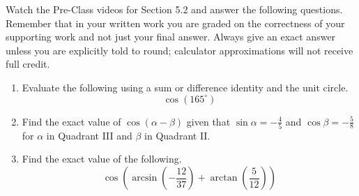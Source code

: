 


\noindent Watch the Pre-Class videos for Section 5.2 and answer the following questions. Remember that in your written work you are graded on the correctness of your supporting work and not just your final answer. Always give an exact answer unless you are explicitly told to round; calculator approximations will not receive full credit.


\begin{enumerate}
\item  Evaluate the following using a sum or difference identity and the unit circle.
$$\cos(165^\circ)$$

\vfill

\item  Find the exact value of $\cos (\alpha - \beta)$ given that $\sin \alpha = -\frac{4}{5}$ and $\cos \beta = -\frac{5}{8}$ for $\alpha$ in Quadrant III and $\beta$ in Quadrant II.
\vfill
\vfill


\newpage
\item  Find the exact value of the following.  $$\cos \left( \arcsin \left(-\frac{12}{37}\right)+\arctan \left(\frac{5}{12}\right)\right)$$
\vfill

\end{enumerate}



